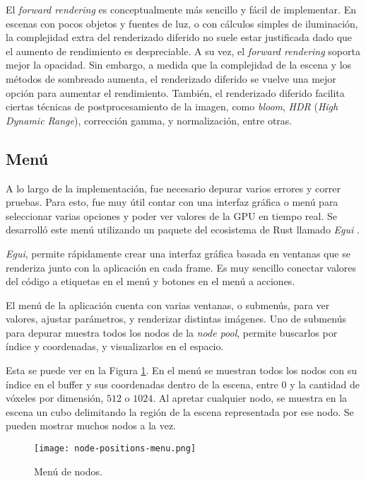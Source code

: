 El \textit{forward rendering} es conceptualmente más sencillo y fácil de implementar.
En escenas con pocos objetos y fuentes de luz, o con cálculos simples de iluminación, la complejidad extra del renderizado diferido no suele estar justificada dado que el aumento de rendimiento es despreciable.
A su vez, el \textit{forward rendering} soporta mejor la opacidad.
Sin embargo, a medida que la complejidad de la escena y los métodos de sombreado aumenta, el renderizado diferido se vuelve una mejor opción para aumentar el rendimiento.
También, el renderizado diferido facilita ciertas técnicas de postprocesamiento de la imagen, como \textit{bloom}, \textit{HDR} (\textit{High Dynamic Range}), corrección gamma, y normalización, entre otras.

\subsection{Menú}

A lo largo de la implementación, fue necesario depurar varios errores y correr pruebas.
Para esto, fue muy útil contar con una interfaz gráfica o menú para seleccionar varias opciones y poder ver valores de la GPU en tiempo real.
Se desarrolló este menú utilizando un paquete del ecosistema de Rust llamado \textit{Egui} \cite{egui}.

\textit{Egui}, permite rápidamente crear una interfaz gráfica basada en ventanas que se renderiza junto con la aplicación en cada frame.
Es muy sencillo conectar valores del código a etiquetas en el menú y botones en el menú a acciones.

El menú de la aplicación cuenta con varias ventanas, o submenús, para ver valores, ajustar parámetros, y renderizar distintas imágenes.
Uno de submenús para depurar muestra todos los nodos de la \textit{node pool}, permite buscarlos por índice y coordenadas, y visualizarlos en el espacio.

Esta se puede ver en la Figura \ref{fig:node-positions-menu}.
En el menú se muestran todos los nodos con su índice en el buffer y sus coordenadas dentro de la escena, entre $0$ y la cantidad de vóxeles por dimensión, $512$ o $1024$.
Al apretar cualquier nodo, se muestra en la escena un cubo delimitando la región de la escena representada por ese nodo.
Se pueden mostrar muchos nodos a la vez.

\begin{figure}
    \centering
    \texttt{[image: node-positions-menu.png]}
    \caption{Menú de nodos.}
    \label{fig:node-positions-menu}
\end{figure}


